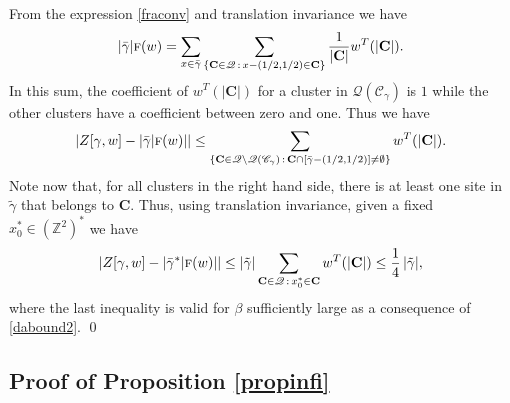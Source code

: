 \documentclass[JEP,XML,SOM,Unicode, NoFloatCountersInSection]{cedram}
\let\mathcal\mathscr
\newcommand{\sep}{\,:\,}
\numberwithin{equation}{section}
\theoremstyle{plain}
\theoremstyle{definition}
\newcommand{\cQ}{{\ensuremath{\mathcal Q}} }
\newcommand{\cC}{{\ensuremath{\mathcal C}} }
\newcommand{\bC}{{\ensuremath{\mathbf C}} }
\newcommand{\bbZ}{{\ensuremath{\mathbb Z}} }
\newcommand{\gb}{\beta}
\newcommand{\gga}{\gamma}
\newcommand{\tf}{\textsc{f}}
\begin{document}
From the expression \eqref{fraconv} and translation invariance we have
\begin{equation*}
|\bar \gamma|\tf(w)= \sum_{x\in \bar \gamma }\sum_{\{\bC\in \cQ \sep x-(1/2,1/2) \in \bC\}} \frac{1}{|\bC|}w^T(|\bC|).
\end{equation*}
In this sum, the coefficient of $w^T(|\bC|)$ for a cluster in $\cQ(\cC_{\gga})$ is $1$ while the other clusters have a coefficient between zero and one.
Thus we have
\begin{equation*}
\left|Z[\gamma,w]- |\bar \gamma|\tf(w)| \right|\le \sum_{\{\bC\in \cQ\setminus \cQ(\cC_{\gamma}) \sep \bC\cap [\bar \gamma-(1/2,1/2)]\ne \emptyset \}} w^T(|\bC|).
\end{equation*}
Note now that, for all clusters in the right hand side, there is at least one site in $\tilde \gamma$ that belongs to $\bC$. Thus, using translation invariance,
given a fixed $x^*_0\in (\bbZ^2)^*$ we have
\begin{equation*}
\left|Z[\gamma,w]- |\bar \gamma^*|\tf(w)| \right|\le |\tilde \gamma|\sum_{\bC\in \cQ \sep x_0^* \in \bC} w^T(|\bC|)\le \frac{1}{4}\,|\tilde \gamma|,
\end{equation*}
where the last inequality is valid for $\gb$ sufficiently large as a consequence of \eqref{dabound2}.
\qed

\subsection{Proof of Proposition \ref{propinfi}}\label{ppropinf}
\end{document}
